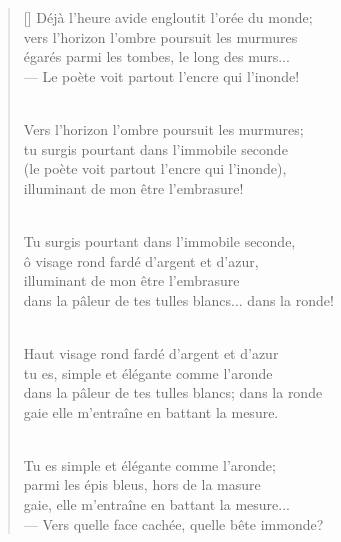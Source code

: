 \documentclass[11pt,a4paper]{article}
\begin{document}
\thispagestyle{empty}


\settowidth{\versewidth}{dans la pâleur de tes tulles blancs... dans la ronde!}

\bigskip

\begin{verse}[\versewidth]
Déjà l'heure avide engloutit l'orée du monde; \\
vers l'horizon l'ombre poursuit les murmures \\
égarés parmi les tombes, le long des murs... \\
--- Le poète voit partout l'encre qui l'inonde! \\ \

Vers l'horizon l'ombre poursuit les murmures; \\
tu surgis pourtant dans l'immobile seconde \\
(le poète voit partout l'encre qui l'inonde), \\
illuminant de mon être l'embrasure! \\ \

Tu surgis pourtant dans l'immobile seconde, \\
ô visage rond fardé d'argent et d'azur, \\
illuminant de mon être l'embrasure \\
dans la pâleur de tes tulles blancs... dans la ronde! \\ \

Haut visage rond fardé d'argent et d'azur \\
tu es, simple et élégante comme l'aronde \\
dans la pâleur de tes tulles blancs; dans la ronde \\
gaie elle m'entraîne en battant la mesure. \\ \

Tu es simple et élégante comme l'aronde; \\
parmi les épis bleus, hors de la masure \\
gaie, elle m'entraîne en battant la mesure... \\
--- Vers quelle face cachée, quelle bête immonde?
\end{verse}
\end{document}
